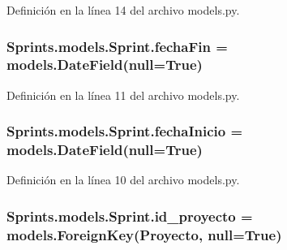 Definición en la línea 14 del archivo models.\+py.

\subsubsection[{\texorpdfstring{fecha\+Fin}{fechaFin}}]{\setlength{\rightskip}{0pt plus 5cm}Sprints.\+models.\+Sprint.\+fecha\+Fin = models.\+Date\+Field(null=True)\hspace{0.3cm}{\ttfamily [static]}}\hypertarget{class_sprints_1_1models_1_1_sprint_a218867a666420d6b2cec0503b5079881}{}\label{class_sprints_1_1models_1_1_sprint_a218867a666420d6b2cec0503b5079881}


Definición en la línea 11 del archivo models.\+py.

\subsubsection[{\texorpdfstring{fecha\+Inicio}{fechaInicio}}]{\setlength{\rightskip}{0pt plus 5cm}Sprints.\+models.\+Sprint.\+fecha\+Inicio = models.\+Date\+Field(null=True)\hspace{0.3cm}{\ttfamily [static]}}\hypertarget{class_sprints_1_1models_1_1_sprint_a7993b1db9672285b74bf48be881dd068}{}\label{class_sprints_1_1models_1_1_sprint_a7993b1db9672285b74bf48be881dd068}


Definición en la línea 10 del archivo models.\+py.

\subsubsection[{\texorpdfstring{id\+\_\+proyecto}{id_proyecto}}]{\setlength{\rightskip}{0pt plus 5cm}Sprints.\+models.\+Sprint.\+id\+\_\+proyecto = models.\+Foreign\+Key({\bf Proyecto}, null=True)\hspace{0.3cm}{\ttfamily [static]}}\hypertarget{class_sprints_1_1models_1_1_sprint_ae5815ea36c2c34f5eed0c61b6f89254b}{}\label{class_sprints_1_1models_1_1_sprint_ae5815ea36c2c34f5eed0c61b6f89254b}


